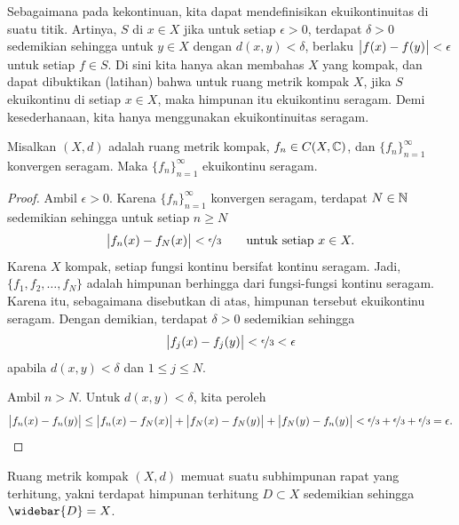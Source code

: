 Sebagaimana pada kekontinuan, kita dapat mendefinisikan ekuikontinuitas di suatu titik.
Artinya, $S$ \emph{} di $x \in X$
jika untuk setiap $\epsilon > 0$, terdapat $\delta > 0$
sedemikian sehingga untuk $y \in X$ dengan $d(x,y) < \delta$, berlaku
$\bigl\lvert {f(x)-f(y)} \bigr\rvert < \epsilon$ untuk setiap $f \in S$.
Di sini kita hanya akan membahas $X$ yang kompak, dan
dapat dibuktikan (latihan) bahwa untuk ruang metrik kompak $X$,
jika $S$ ekuikontinu di setiap $x \in X$,
maka himpunan itu ekuikontinu seragam.  Demi kesederhanaan,
kita hanya menggunakan ekuikontinuitas seragam.

\begin{prop}
Misalkan $(X,d)$ adalah ruang metrik kompak,
$f_n \in C(X,{\mathbb{C}})$, dan $\{ f_n \}_{n=1}^\infty$
konvergen seragam.  Maka $\{ f_n \}_{n=1}^\infty$ ekuikontinu seragam.
\end{prop}

\begin{proof}
Ambil $\epsilon > 0$.
Karena $\{ f_n \}_{n=1}^\infty$ konvergen seragam, terdapat $N \in {\mathbb{N}}$ sedemikian sehingga untuk
setiap $n \geq N$
\begin{equation*}
\bigl\lvert {f_n(x)-f_N(x)} \bigr\rvert < \nicefrac{\epsilon}{3} \qquad \text{untuk setiap } x \in X.
\end{equation*}
Karena $X$ kompak, setiap fungsi kontinu bersifat kontinu seragam.
Jadi, $\{ f_1,f_2,\ldots,f_N \}$ adalah himpunan berhingga dari fungsi-fungsi kontinu
seragam.  Karena itu, sebagaimana disebutkan di atas, himpunan tersebut ekuikontinu seragam.
Dengan demikian, terdapat $\delta > 0$ sedemikian sehingga
\begin{equation*}
\bigl\lvert {f_j(x)-f_j(y)} \bigr\rvert < \nicefrac{\epsilon}{3} < \epsilon
\end{equation*}
apabila $d(x,y) < \delta$ dan $1 \leq j \leq N$.

Ambil $n > N$.  Untuk $d(x,y) < \delta$, kita peroleh
\begin{equation*}
\bigl\lvert {f_n(x)-f_n(y)} \bigr\rvert
\leq
\bigl\lvert {f_n(x)-f_N(x)} \bigr\rvert
+
\bigl\lvert {f_N(x)-f_N(y)} \bigr\rvert
+
\bigl\lvert {f_N(y)-f_n(y)} \bigr\rvert
<
\nicefrac{\epsilon}{3}
+
\nicefrac{\epsilon}{3}
+
\nicefrac{\epsilon}{3}
=\epsilon . \qedhere
\end{equation*}
\end{proof}

\begin{prop}
Ruang metrik kompak $(X,d)$ memuat suatu subhimpunan rapat yang terhitung,
yakni terdapat himpunan terhitung $D \subset X$ sedemikian sehingga $\widebar{D} = X$.
\end{prop}

